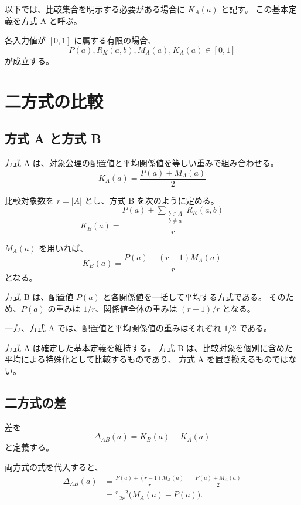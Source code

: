 \documentclass[a4paper,11pt]{ltjsarticle}
\begin{document}
以下では、比較集合を明示する必要がある場合に $K_A(a)$ と記す。
この基本定義を方式 A と呼ぶ。

各入力値が $[0,1]$ に属する有限の場合、
\begin{equation}
  P(a),R_K(a,b),M_A(a),K_A(a)\in[0,1]
\end{equation}
が成立する。

\section{二方式の比較}

\subsection{方式 A と方式 B}

方式 A は、対象公理の配置値と平均関係値を等しい重みで組み合わせる。
\begin{equation}
  K_A(a)=\frac{P(a)+M_A(a)}{2}
\end{equation}

比較対象数を $r=|A|$ とし、方式 B を次のように定める。
\begin{equation}
  \boxed{
  K_B(a)
  =
  \frac{
    P(a)+\displaystyle\sum_{\substack{b\in A\\b\ne a}}R_K(a,b)
  }{r}
  }
\end{equation}

$M_A(a)$ を用いれば、
\begin{equation}
  K_B(a)
  =
  \frac{P(a)+(r-1)M_A(a)}{r}
\end{equation}
となる。

方式 B は、配置値 $P(a)$ と各関係値を一括して平均する方式である。
そのため、$P(a)$ の重みは $1/r$、関係値全体の重みは
$(r-1)/r$ となる。

一方、方式 A では、配置値と平均関係値の重みはそれぞれ $1/2$ である。

方式 A は確定した基本定義を維持する。
方式 B は、比較対象を個別に含めた平均による特殊化として比較するものであり、
方式 A を置き換えるものではない。

\subsection{二方式の差}

差を
\begin{equation}
  \Delta_{AB}(a)=K_B(a)-K_A(a)
\end{equation}
と定義する。

両方式の式を代入すると、
\begin{align}
  \Delta_{AB}(a)
  &=
  \frac{P(a)+(r-1)M_A(a)}{r}
  -\frac{P(a)+M_A(a)}{2}\\
  &=
  \boxed{
  \frac{r-2}{2r}
  \bigl(M_A(a)-P(a)\bigr)
  }.
\end{align}
\end{document}
